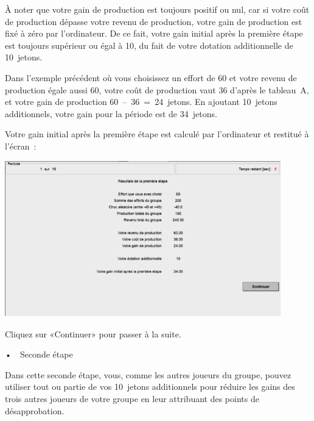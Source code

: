 \begin{Article}
\begin{refsection}[Lebourges]
\begin{appendices}
\begin{center}
\noindent{}
\end{center}

À noter que votre gain de production est toujours positif ou nul, car si
votre coût de production dépasse votre revenu de production, votre gain
de production est fixé à zéro par l'ordinateur. De ce fait, votre gain
initial après la première étape est toujours supérieur ou égal à 10, du
fait de votre dotation additionnelle de 10~jetons.

Dans l'exemple précédent où vous choisissez un effort de 60 et votre
revenu de production égale aussi 60, votre coût de production vaut 36
d'après le tableau~A, et votre gain de production 60~--~36~=~24~jetons.
En ajoutant 10~jetons additionnels, votre gain pour la période est de
34~jetons.

Votre gain initial après la première étape est calculé par l'ordinateur
et restitué à l'écran~:

\vspace{0,2cm}

\includegraphics[width = 0.9\textwidth]{05_fig6-annexII.png}

Cliquez sur «Continuer» pour passer à la suite.
\vspace{0,2cm}

•~~Seconde étape

\vspace{0,2cm}
Dans cette seconde étape, vous, comme les autres joueurs du groupe,
pouvez utiliser tout ou partie de vos 10~jetons additionnels pour
réduire les gains des trois autres joueurs de votre groupe en leur
attribuant des points de désapprobation.


\end{appendices}
\end{refsection}
\end{Article}
